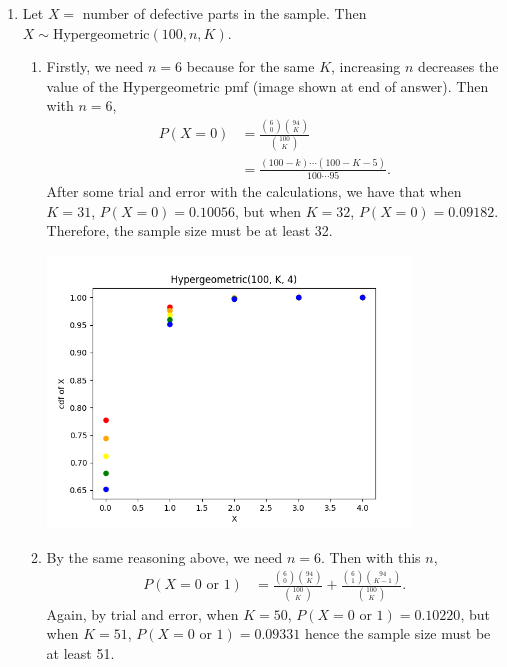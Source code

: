 \documentclass{article}
\begin{document}
\begin{enumerate}
    \item Let $X = $ number of defective parts in the sample. Then \\
    $X \sim \text{Hypergeometric}(100, n, K)$.
    \begin{enumerate}
        \item Firstly, we need $n = 6$ because for the same $K$, increasing $n$ decreases the 
        value of the Hypergeometric pmf (image shown at end of answer). Then with $n = 6$, 
        \begin{align*}
            P(X = 0) 
            &= \frac{\binom{6}{0}\binom{94}{K}}{\binom{100}{K}} \\
            &= \frac{(100 - k)\cdots (100 - K - 5)}{100 \cdots 95}.
        \end{align*}
        After some trial and error with the calculations, we have that when 
        $K = 31$, $P(X = 0) = 0.10056$, but when $K = 32$, $P(X = 0) = 0.09182$. Therefore, 
        the sample size must be at least 32.
        \begin{center}
            \includegraphics*[width=0.8\textwidth]{../scripts/3-2.png}
        \end{center}
        
        \item By the same reasoning above, we need $n = 6$. Then with this $n$,
        \begin{align*}
            P(X = 0 \text{ or } 1) 
            &= \frac{\binom{6}{0}\binom{94}{K}}{\binom{100}{K}} 
            + \frac{\binom{6}{1}\binom{94}{K - 1}}{\binom{100}{K}}.
        \end{align*}
        Again, by trial and error, when $K = 50$, $P(X = 0 \text{ or } 1) = 0.10220$, but when 
        $K = 51$, $P(X = 0 \text{ or } 1) =0.09331$ hence the sample size must be at least 51.
    \end{enumerate}


\end{enumerate}
\end{document}
